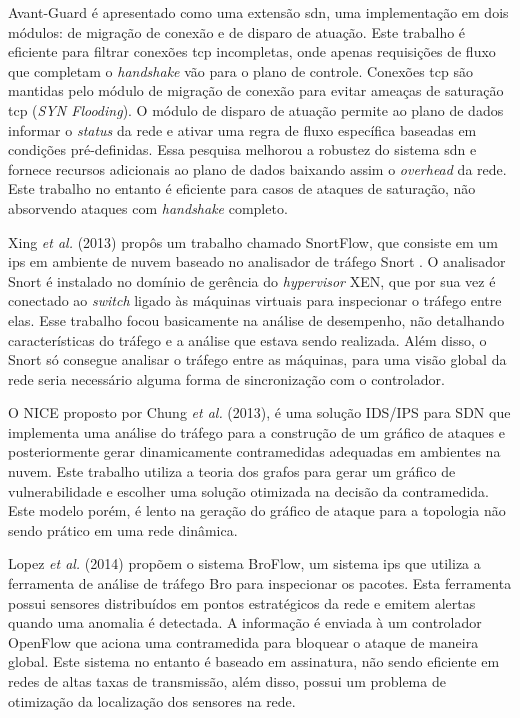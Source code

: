 Avant-Guard \cite{Shin:2013} é apresentado como uma extensão \gls{sdn}, uma implementação em dois módulos: de migração de conexão e de disparo de atuação. Este trabalho é eficiente para filtrar conexões \gls{tcp} incompletas, onde apenas requisições de fluxo que completam o \textit{handshake} vão para o plano de controle. Conexões \gls{tcp} são mantidas pelo módulo de migração de conexão para evitar ameaças de saturação \gls{tcp} (\textit{SYN Flooding}). O módulo de disparo de atuação permite ao plano de dados informar o \textit{status} da rede e ativar uma regra de fluxo específica baseadas em condições pré-definidas. Essa pesquisa melhorou a robustez do sistema \gls{sdn} e fornece recursos adicionais ao plano de dados baixando assim o \textit{overhead} da rede. Este trabalho no entanto é eficiente para casos de ataques de saturação, não absorvendo ataques com \textit{handshake} completo.


Xing \textit{et al.} (2013) \nocite{Xing:2013} propôs um trabalho chamado SnortFlow, que consiste em um \gls{ips} em ambiente de nuvem baseado no analisador de tráfego Snort \cite{Roesch:1999}. O analisador Snort é instalado no domínio de gerência do \textit{hypervisor} XEN, que por sua vez é conectado ao \textit{switch} ligado às máquinas virtuais para inspecionar o tráfego entre elas. Esse trabalho focou basicamente na análise de desempenho, não detalhando características do tráfego e a análise que estava sendo realizada. Além disso, o Snort só consegue analisar o tráfego entre as máquinas, para uma visão global da rede seria necessário alguma forma de sincronização com o controlador.


O NICE proposto por Chung \textit{et al.} (2013)\nocite{Chung:2013}, é uma solução IDS/IPS para SDN que implementa uma análise do tráfego para a construção de um gráfico de ataques e posteriormente gerar dinamicamente contramedidas adequadas em ambientes na nuvem. Este trabalho utiliza a teoria dos grafos para gerar um gráfico de vulnerabilidade e escolher uma solução otimizada na decisão da contramedida. Este modelo porém, é lento na geração do gráfico de ataque para a topologia não sendo prático em uma rede dinâmica.


Lopez \textit{et al.} (2014)\nocite{Lopez:2014} propõem o sistema BroFlow, um sistema \gls{ips} que utiliza a ferramenta de análise de tráfego Bro \cite{Sommer:2010} para inspecionar os pacotes. Esta ferramenta possui sensores distribuídos em pontos estratégicos da rede e emitem alertas quando uma anomalia é detectada. A informação é enviada à um controlador OpenFlow que aciona uma contramedida para bloquear o ataque de maneira global. Este sistema no entanto é baseado em assinatura, não sendo eficiente em redes de altas taxas de transmissão, além disso, possui um problema de otimização da localização dos sensores na rede.

